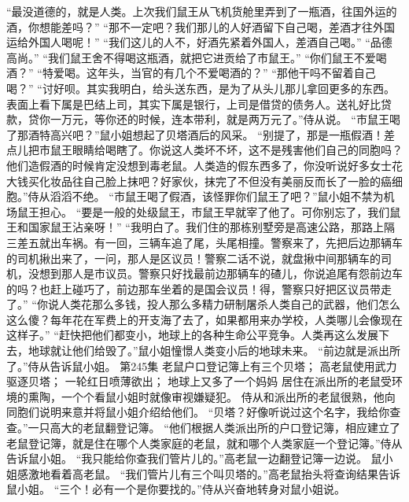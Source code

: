 \documentclass[a4paper,12pt,UTF8,twoside]{ctexbook}
\begin{document}
        “最没道德的，就是人类。上次我们鼠王从飞机货舱里弄到了一瓶酒，往国外运的酒，你想能差吗？”  
        “那不一定吧？我们那儿的人好酒留下自己喝，差酒才往外国运给外国人喝呢！”  
        “我们这儿的人不，好酒先紧着外国人，差酒自己喝。”  
        “品德高尚。”  
        “我们鼠王舍不得喝这瓶酒，就把它进贡给了市鼠王。”  
        “你们鼠王不爱喝酒？”  
        “特爱喝。这年头，当官的有几个不爱喝酒的？”  
        “那他干吗不留着自己喝？”  
        “讨好呗。其实我明白，给头送东西，是为了从头儿那儿拿回更多的东西。表面上看下属是巴结上司，其实下属是银行，上司是借贷的债务人。送礼好比贷款，贷你一万元，等你还的时候，连本带利，就是两万元了。”侍从说。  
        “市鼠王喝了那酒特高兴吧？”鼠小姐想起了贝塔酒后的风采。        
        “别提了，那是一瓶假酒！差点儿把市鼠王眼睛给喝瞎了。你说这人类坏不坏，这不是残害他们自己的同胞吗？他们造假酒的时候肯定没想到毒老鼠。人类造的假东西多了，你没听说好多女士花大钱买化妆品往自己脸上抹吧？好家伙，抹完了不但没有美丽反而长了一脸的癌细胞。”侍从滔滔不绝。  
        “市鼠王喝了假酒，该怪罪你们鼠王了吧？”鼠小姐不禁为机场鼠王担心。  
        “要是一般的处级鼠王，市鼠王早就宰了他了。可你别忘了，我们鼠王和国家鼠王沾亲呀！”  
        “我明白了。我们住的那栋别墅旁是高速公路，那路上隔三差五就出车祸。有一回，三辆车追了尾，头尾相撞。警察来了，先把后边那辆车的司机揪出来了，一问，那人是区议员！警察二话不说，就盘揪中间那辆车的司机，没想到那人是市议员。警察只好找最前边那辆车的碴儿，你说追尾有怨前边车的吗？也赶上碰巧了，前边那车坐着的是国会议员！得，警察只好把区议员带走了。”  
        “你说人类花那么多钱，投人那么多精力研制屠杀人类自己的武器，他们怎么这么傻？每年花在军费上的开支海了去了，如果都用来办学校，人类哪儿会像现在这样子。”  
        “赶快把他们都变小，地球上的各种生命公平竞争。人类再这么发展下去，地球就让他们给毁了。”鼠小姐憧憬人类变小后的地球未来。  
        “前边就是派出所了。”侍从告诉鼠小姐。          第245集  
        老鼠户口登记簿上有三个贝塔；  
        高老鼠使用武力驱逐贝塔；  
        一轮红日喷薄欲出；  
        地球上又多了一个妈妈    
        居住在派出所的老鼠受环境的熏陶，一个个看鼠小姐时就像审视嫌疑犯。  
        侍从和派出所的老鼠很熟，他向同胞们说明来意并将鼠小姐介绍给他们。  
        “贝塔？好像听说过这个名字，我给你查查。”一只高大的老鼠翻登记簿。  
        “他们根据人类派出所的户口登记簿，相应建立了老鼠登记簿，就是住在哪个人类家庭的老鼠，就和哪个人类家庭一个登记簿。”侍从告诉鼠小姐。  
        “我只能给你查我们管片儿的。”高老鼠一边翻登记簿一边说。        
        鼠小姐感激地看着高老鼠。  
        “我们管片儿有三个叫贝塔的。”高老鼠抬头将查询结果告诉鼠小姐。  
        “三个！必有一个是你要找的。”侍从兴奋地转身对鼠小姐说。  
\end{document}
